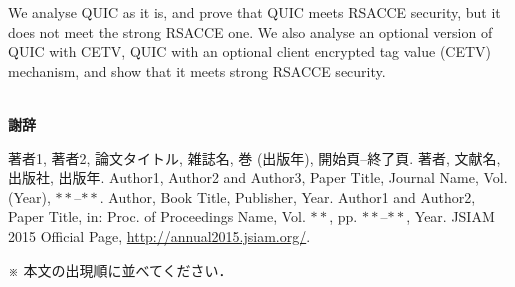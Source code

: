 \documentclass[11pt,a4j]{jarticle}
\def\thanks{~\\[.5\baselineskip]{\bf 謝辞}\hspace*{1zw}}
\begin{document}
%
We analyse QUIC as it is, and prove that QUIC meets RSACCE security, but it does not meet
the strong RSACCE one.
We also analyse an optional version of QUIC with CETV, QUIC with an optional client encrypted tag value
(CETV) mechanism, and show that it meets strong RSACCE security.

\thanks
%
\dotfill \\ \dotfill
%
\begin{thebibliography}{10}
%
著者1, 著者2, 論文タイトル, 雑誌名, 巻 (出版年), 開始頁--終了頁.
%
著者, 文献名, 出版社, 出版年.
%
Author1, Author2 and Author3, Paper Title, Journal Name, Vol. (Year), $\ast\ast$--$\ast\ast$.
%
Author, Book Title, Publisher, Year.
%
Author1 and Author2, Paper Title, in: Proc. of Proceedings Name, Vol. $\ast\ast$, pp. $\ast\ast$--$\ast\ast$, Year.
%
JSIAM 2015 Official Page, \url{http://annual2015.jsiam.org/}.
\end{thebibliography}
※ 本文の出現順に並べてください．
%
\end{document}
